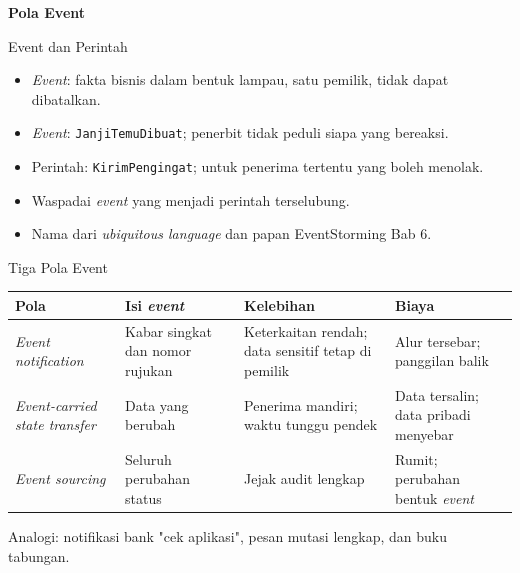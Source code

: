\documentclass[aspectratio=169, table, 12pt]{beamer}
\begin{document}
\begin{frame}{\hfill}
  \centering
  \Huge{\textbf{Pola Event}}
\end{frame}

\begin{frame}{{\Large Event dan Perintah}}
  \vspace{6pt}
  \begin{itemize}
    \item \textit{Event}: fakta bisnis dalam bentuk lampau, satu pemilik,
          tidak dapat dibatalkan.
    \item \textit{Event}: \texttt{JanjiTemuDibuat}; penerbit tidak peduli siapa
          yang bereaksi.
    \item Perintah: \texttt{KirimPengingat}; untuk penerima tertentu yang boleh
          menolak.
    \item Waspadai \textit{event} yang menjadi perintah terselubung.
    \item Nama dari \textit{ubiquitous language} dan papan EventStorming Bab 6.
  \end{itemize}
\end{frame}

\begin{frame}{{\Large Tiga Pola Event}}
  \scriptsize
  \begin{tabularx}{\textwidth}{>{\raggedright\arraybackslash}p{2.6cm}
      >{\raggedright\arraybackslash}X >{\raggedright\arraybackslash}X
      >{\raggedright\arraybackslash}X}
    \hline
    \textbf{Pola} & \textbf{Isi \textit{event}} & \textbf{Kelebihan}
      & \textbf{Biaya} \\
    \hline
    \textit{Event notification} & Kabar singkat dan nomor rujukan
      & Keterkaitan rendah; data sensitif tetap di pemilik
      & Alur tersebar; panggilan balik \\
    \hline
    \textit{Event-carried state transfer} & Data yang berubah
      & Penerima mandiri; waktu tunggu pendek
      & Data tersalin; data pribadi menyebar \\
    \hline
    \textit{Event sourcing} & Seluruh perubahan status
      & Jejak audit lengkap & Rumit; perubahan bentuk \textit{event} \\
    \hline
  \end{tabularx}

  \vspace{10pt}
  \small
  Analogi: notifikasi bank "cek aplikasi", pesan mutasi lengkap, dan buku
  tabungan.
\end{frame}
\end{document}
